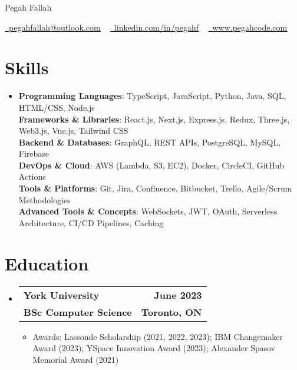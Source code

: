 \documentclass[letterpaper,11pt]{article}
\makeatletter
\newcommand{\resumeItem}[1]{
  \item\small{
    {#1 \vspace{-2pt}}
  }
}
\newcommand{\resumeSubheading}[4]{
  \vspace{-2pt}\item
    \begin{tabular*}{1.0\textwidth}[t]{l@{\extracolsep{\fill}}r}
      \textbf{#1} & \textbf{\small #2} \\
      \textbf{\small #3} & \textbf{\small #4} \\
    \end{tabular*}\vspace{-7pt}
}
\newcommand{\resumeSubHeadingListStart}{\begin{itemize}[leftmargin=0.0in, label={}]}
\newcommand{\resumeSubHeadingListEnd}{\end{itemize}}
\newcommand{\resumeItemListStart}{\begin{itemize}}
\newcommand{\resumeItemListEnd}{\end{itemize}\vspace{-5pt}}
\makeatother
\begin{document}
\begin{center}
{\Huge Pegah Fallah} \ \vspace{1pt}

\small \href{mailto:pegahfallah@outlook.com}{\raisebox{-0.2\height}\faEnvelope\ \underline{pegahfallah@outlook.com}} ~
\href{https://linkedin.com/in/pegahf}{\raisebox{-0.2\height}\faLinkedin\ \underline{linkedin.com/in/pegahf}} ~
\href{http://www.pegahcode.com}{\raisebox{-0.2\height}\faGlobe\ \underline{www.pegahcode.com}} ~
\vspace{-8pt}
\end{center}


\section{Skills}
\resumeSubHeadingListStart
\item{
\small
\textbf{Programming Languages}: TypeScript, JavaScript, Python, Java, SQL, HTML/CSS, Node.js \\

\textbf{Frameworks \& Libraries}: React.js, Next.js, Express.js, Redux, Three.js, Web3.js, Vue.js, Tailwind CSS \\

\textbf{Backend \& Databases}: GraphQL, REST APIs, PostgreSQL, MySQL, Firebase \\

\textbf{DevOps \& Cloud}: AWS (Lambda, S3, EC2), Docker, CircleCI, GitHub Actions \\

\textbf{Tools \& Platforms}: Git, Jira, Confluence, Bitbucket, Trello, Agile/Scrum Methodologies \\

\textbf{Advanced Tools \& Concepts}: WebSockets, JWT, OAuth, Serverless Architecture, CI/CD Pipelines, Caching
}
\resumeSubHeadingListEnd


\section{Education}
\resumeSubHeadingListStart
\resumeSubheading
{York University}{June 2023}
{BSc Computer Science}{Toronto, ON}
\resumeItemListStart
\resumeItem{Awards: Lassonde Scholarship (2021, 2022, 2023); IBM Changemaker Award (2023); YSpace Innovation Award (2023); Alexander Spasov Memorial Award (2021)}
\resumeItemListEnd
\resumeSubHeadingListEnd
\end{document}
